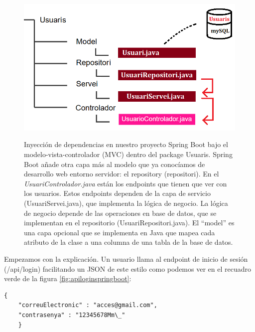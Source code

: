 \documentclass[a4paper,12pt]{report}
\begin{document}
				\FloatBarrier
				\setlength{\belowcaptionskip}{3pt}
				\begin{figure}[H]
					\centering
					\caption{Inyección de dependencias en nuestro proyecto Spring Boot bajo el modelo-vista-controlador (MVC) dentro del package Usuaris. Spring Boot añade otra capa más al modelo que ya conocíamos de desarrollo web entorno servidor: el repository (repositori). En el \textit{UsuariControlador.java} están los endpoints que tienen que ver con los usuarios. Estos endpoints dependen de la capa de servicio (UsuariServei.java), que implementa la lógica de negocio. La lógica de negocio depende de las operaciones en base de datos, que se implementan en el repositorio (UsuariRepositori.java). El ``model'' es una capa opcional que se implementa en Java que mapea cada atributo de la clase a una columna de una tabla de la base de datos.}
					\includegraphics[width=1\linewidth]{img/diagramaInjeccioDependencies}
					\label{fig:diagramaInjeccioDependencies}
				\end{figure}
				\FloatBarrier
					
				Empezamos con la explicación. Un usuario llama al endpoint de inicio de sesión (/api/login) facilitando un JSON de este estilo como podemos ver en el recuadro verde de la figura \ref{fig:apiloginspringboot}:
				
			\begin{lstlisting}[language=xml, basicstyle=\ttfamily\footnotesize, keywordstyle=\color{magenta}]
	{
	"correuElectronic" : "acces@gmail.com", 
	"contrasenya" : "12345678Mm\_" 
	}
			\end{lstlisting}
\end{document}
